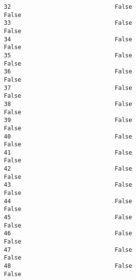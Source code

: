 \documentclass[11pt]{article}
\begin{document}
\begin{Verbatim}[commandchars=\\\{\}]
32                              False                                  False   
33                              False                                  False   
34                              False                                  False   
35                              False                                  False   
36                              False                                  False   
37                              False                                  False   
38                              False                                  False   
39                              False                                  False   
40                              False                                  False   
41                              False                                  False   
42                              False                                  False   
43                              False                                  False   
44                              False                                  False   
45                              False                                  False   
46                              False                                  False   
47                              False                                  False   
48                              False                                  False   


\end{Verbatim}
\end{document}
